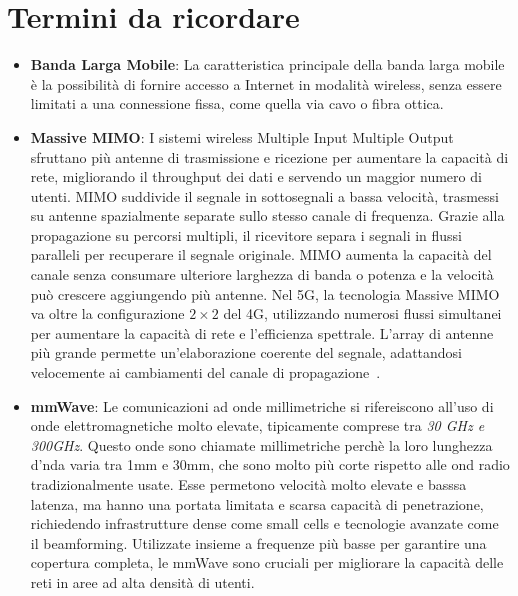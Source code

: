 \documentclass[english]{article}
\begin{document}
\section{Termini da ricordare}
\begin{itemize}
	\item \textbf{\hypertarget{bandalargaMobile}{Banda Larga Mobile}}: La caratteristica principale
	      della banda larga mobile è la possibilità di fornire accesso a Internet in modalità wireless,
	      senza essere limitati a una connessione fissa, come quella via cavo o fibra ottica.

	\item \textbf{\hypertarget{MIMO}{Massive MIMO}}: I sistemi wireless Multiple Input Multiple Output
	      sfruttano più antenne di trasmissione e ricezione per aumentare la capacità di rete,
	      migliorando il throughput dei dati e servendo un maggior numero di utenti. MIMO suddivide
	      il segnale in sottosegnali a bassa velocità, trasmessi su antenne spazialmente separate
	      sullo stesso canale di frequenza. Grazie alla propagazione su percorsi multipli, il
	      ricevitore separa i segnali in flussi paralleli per recuperare il segnale originale.
	      MIMO aumenta la capacità del canale senza consumare ulteriore larghezza di banda o
	      potenza e la velocità può crescere aggiungendo più antenne. Nel 5G, la tecnologia
	      Massive MIMO va oltre la configurazione $2 \times 2$ del 4G, utilizzando numerosi
	      flussi simultanei per aumentare la capacità di rete e l'efficienza spettrale.
	      L'array di antenne più grande permette un'elaborazione coerente del segnale, adattandosi
	      velocemente ai cambiamenti del canale di propagazione~\cite{Kathavate2021Critical}.

	\item \textbf{\hypertarget{mmWave}{mmWave}}: Le comunicazioni ad onde millimetriche
	      si rifereiscono all'uso di onde elettromagnetiche molto elevate, tipicamente comprese
	      tra \textit{30 GHz e 300GHz}. Questo onde sono chiamate millimetriche perchè la loro
	      lunghezza d'nda varia tra 1mm e 30mm, che sono molto più corte rispetto alle ond radio
	      tradizionalmente usate. Esse permetono velocità molto elevate e basssa latenza, ma hanno
	      una portata limitata e scarsa capacità di penetrazione, richiedendo infrastrutture dense
	      come small cells e tecnologie avanzate come il beamforming. Utilizzate insieme
	      a frequenze più basse per garantire una copertura completa,
	      le mmWave sono cruciali per migliorare la capacità delle
	      reti in aree ad alta densità di utenti.


\end{itemize}
\end{document}
